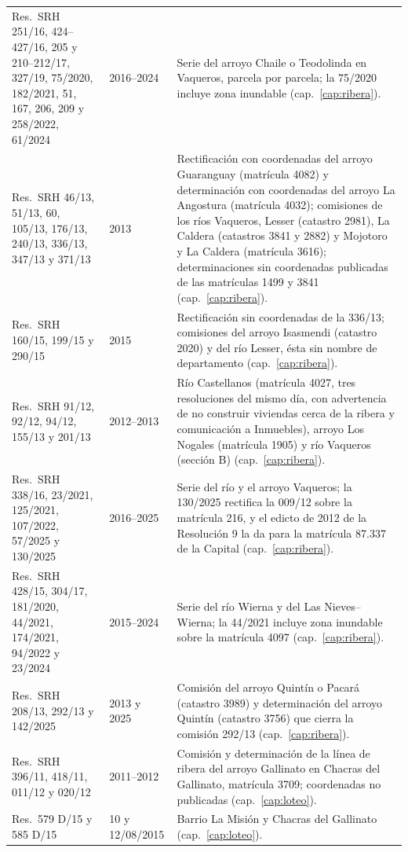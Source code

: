 \begin{longtable}{@{}p{3.2cm}p{1.9cm}p{7.9cm}@{}}
Res.\ SRH 251/16, 424--427/16, 205 y 210--212/17, 327/19, 75/2020, 182/2021, 51, 167, 206, 209 y 258/2022, 61/2024 & 2016--2024 & Serie del arroyo Chaile o Teodolinda en Vaqueros, parcela por parcela; la 75/2020 incluye zona inundable (cap.\ \ref{cap:ribera}). \\
Res.\ SRH 46/13, 51/13, 60, 105/13, 176/13, 240/13, 336/13, 347/13 y 371/13 & 2013 & Rectificación con coordenadas del arroyo Guaranguay (matrícula 4082) y determinación con coordenadas del arroyo La Angostura (matrícula 4032); comisiones de los ríos Vaqueros, Lesser (catastro 2981), La Caldera (catastros 3841 y 2882) y Mojotoro y La Caldera (matrícula 3616); determinaciones sin coordenadas publicadas de las matrículas 1499 y 3841 (cap.\ \ref{cap:ribera}). \\
Res.\ SRH 160/15, 199/15 y 290/15 & 2015 & Rectificación sin coordenadas de la 336/13; comisiones del arroyo Isasmendi (catastro 2020) y del río Lesser, ésta sin nombre de departamento (cap.\ \ref{cap:ribera}). \\
Res.\ SRH 91/12, 92/12, 94/12, 155/13 y 201/13 & 2012--2013 & Río Castellanos (matrícula 4027, tres resoluciones del mismo día, con advertencia de no construir viviendas cerca de la ribera y comunicación a Inmuebles), arroyo Los Nogales (matrícula 1905) y río Vaqueros (sección B) (cap.\ \ref{cap:ribera}). \\
Res.\ SRH 338/16, 23/2021, 125/2021, 107/2022, 57/2025 y 130/2025 & 2016--2025 & Serie del río y el arroyo Vaqueros; la 130/2025 rectifica la 009/12 sobre la matrícula 216, y el edicto de 2012 de la Resolución 9 la da para la matrícula 87.337 de la Capital (cap.\ \ref{cap:ribera}). \\
Res.\ SRH 428/15, 304/17, 181/2020, 44/2021, 174/2021, 94/2022 y 23/2024 & 2015--2024 & Serie del río Wierna y del Las Nieves--Wierna; la 44/2021 incluye zona inundable sobre la matrícula 4097 (cap.\ \ref{cap:ribera}). \\
Res.\ SRH 208/13, 292/13 y 142/2025 & 2013 y 2025 & Comisión del arroyo Quintín o Pacará (catastro 3989) y determinación del arroyo Quintín (catastro 3756) que cierra la comisión 292/13 (cap.\ \ref{cap:ribera}). \\
Res.\ SRH 396/11, 418/11, 011/12 y 020/12 & 2011--2012 & Comisión y determinación de la línea de ribera del arroyo Gallinato en Chacras del Gallinato, matrícula 3709; coordenadas no publicadas (cap.\ \ref{cap:loteo}). \\
Res.\ 579 D/15 y 585 D/15 & 10 y 12/08/2015 & Barrio La Misión y Chacras del Gallinato (cap.\ \ref{cap:loteo}). \\

\end{longtable}
